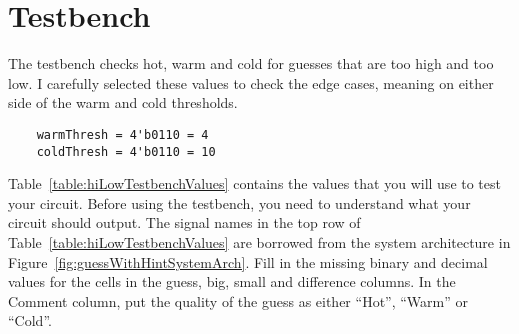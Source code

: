\section{Testbench}

The testbench checks hot, warm and cold for guesses that
are too high and too low. I carefully selected these values to check the
edge cases, meaning on either side of the warm and cold thresholds.
\begin{verbatim}
	warmThresh = 4'b0110 = 4
	coldThresh = 4'b0110 = 10
\end{verbatim}

Table~\ref{table:hiLowTestbenchValues} contains the values that you will use to test your circuit.
Before using the testbench, you need to understand what your circuit
should output. The signal names in the top row of Table~\ref{table:hiLowTestbenchValues} are borrowed
from the system architecture in Figure~\ref{fig:guessWithHintSystemArch}. Fill in the missing binary and
decimal values for the cells in the guess, big, small and difference
columns. In the Comment column, put the quality of the guess as either
``Hot'', ``Warm'' or ``Cold''.

